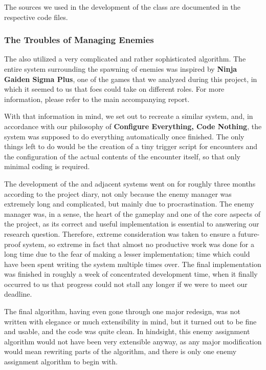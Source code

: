\documentclass[../Main.tex]{subfiles}
\begin{document}
The sources we used in the development of the class are documented in the respective code files.

\subsubsection{The Troubles of Managing Enemies}\label{sec:the-troubles-of-managing-enemies}

The  also utilized a very complicated and rather sophisticated algorithm. The entire system surrounding the spawning of enemies was inspired by \textbf{Ninja Gaiden Sigma Plus}, one of the games that we analyzed during this project, in which it seemed to us that foes could take on different roles. For more information, please refer to the main accompanying report.

With that information in mind, we set out to recreate a similar system, and, in accordance with our philosophy of \textbf{Configure Everything, Code Nothing}, the system was supposed to do everything automatically once finished. The only things left to do would be the creation of a tiny trigger script for encounters and the configuration of the actual contents of the encounter itself, so that only minimal coding is required.

The development of the  and adjacent systems went on for roughly three months according to the project diary, not only because the enemy manager was extremely long and complicated, but mainly due to procrastination. The enemy manager was, in a sense, the heart of the gameplay and one of the core aspects of the project, as its correct and useful implementation is essential to answering our research question. Therefore, extreme consideration was taken to ensure a future-proof system, so extreme in fact that almost no productive work was done for a long time due to the fear of making a lesser implementation; time which could have been spent writing the system multiple times over. The final implementation was finished in roughly a week of concentrated development time, when it finally occurred to us that progress could not stall any longer if we were to meet our deadline.

The final algorithm, having even gone through one major redesign, was not written with elegance or much extensibility in mind, but it turned out to be fine and usable, and the code was quite clean. In hindsight, this enemy assignment algorithm would not have been very extensible anyway, as any major modification would mean rewriting parts of the algorithm, and there is only one enemy assignment algorithm to begin with.
\end{document}
